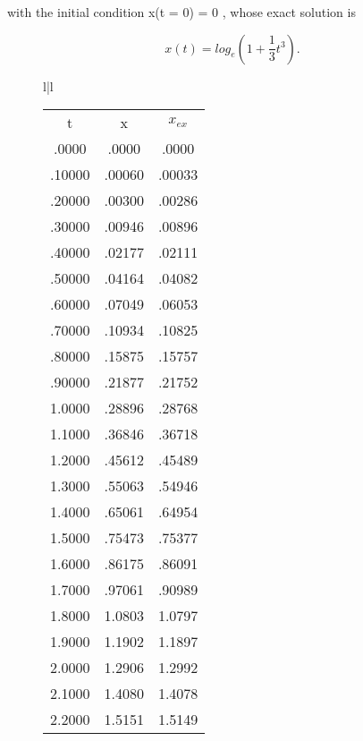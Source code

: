 with the initial condition x(t = 0) = 0 , whose exact solution is

\begin{equation}
    x(t) =log_e(1 +\frac{1}{3}t^3).
    \label{eq:06_22} 
\end{equation}

\begin{figure}
    \centering
    \begin{tabular}{l|l}
        \begin{tabular}{ccc}
            \multicolumn{1}{c}{t} &  \multicolumn{1}{c}{x}  & \multicolumn{1}{c}{$x_{ex}$}\\
                .0000  & .0000  & .0000   \\
                .10000 & .00060 & .00033  \\
                .20000 & .00300 & .00286  \\
                .30000 & .00946 & .00896  \\
                .40000 & .02177 & .02111  \\
                .50000 & .04164 & .04082  \\
                .60000 & .07049 & .06053  \\
                .70000 & .10934 & .10825  \\
                .80000 & .15875 & .15757  \\
                .90000 & .21877 & .21752  \\
                1.0000 & .28896 & .28768  \\
                1.1000 & .36846 & .36718  \\
                1.2000 & .45612 & .45489  \\
                1.3000 & .55063 & .54946  \\
                1.4000 & .65061 & .64954  \\
                1.5000 & .75473 & .75377  \\
                1.6000 & .86175 & .86091  \\
                1.7000 & .97061 & .90989  \\
                1.8000 & 1.0803 & 1.0797  \\
                1.9000 & 1.1902 & 1.1897  \\
                2.0000 & 1.2906 & 1.2992  \\
                2.1000 & 1.4080 & 1.4078  \\
                2.2000 & 1.5151 & 1.5149  \\

\end{tabular}
\end{tabular}
\end{figure}
